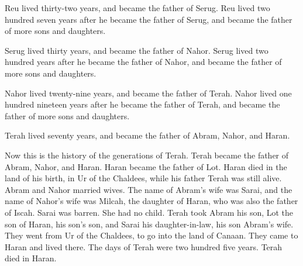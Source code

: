{\par }{\PP {}Reu lived thirty-two years, and became the father of Serug.
Reu lived two hundred seven years after he became the father of Serug, and became the father of more sons and daughters.
\par }{\PP {}Serug lived thirty years, and became the father of Nahor.
Serug lived two hundred years after he became the father of Nahor, and became the father of more sons and daughters.
\par }{\PP {}Nahor lived twenty-nine years, and became the father of Terah.
Nahor lived one hundred nineteen years after he became the father of Terah, and became the father of more sons and daughters.
\par }{\PP {}Terah lived seventy years, and became the father of Abram, Nahor, and Haran.
\par }{\PP {}Now this is the history of the generations of Terah. Terah became the father of Abram, Nahor, and Haran. Haran became the father of Lot.
Haran died in the land of his birth, in Ur of the Chaldees, while his father Terah was still alive.
Abram and Nahor married wives. The name of Abram’s wife was Sarai, and the name of Nahor’s wife was Milcah, the daughter of Haran, who was also the father of Iscah.
Sarai was barren. She had no child.
Terah took Abram his son, Lot the son of Haran, his son’s son, and Sarai his daughter-in-law, his son Abram’s wife. They went from Ur of the Chaldees, to go into the land of Canaan. They came to Haran and lived there.
The days of Terah were two hundred five years. Terah died in Haran.

}
